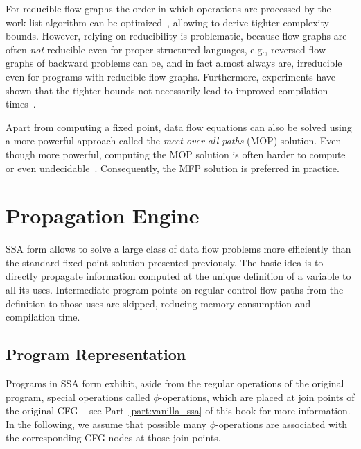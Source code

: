 For reducible flow graphs the order in which operations are processed by the
work list algorithm can be
optimized~\cite{novillo:bib:HU73,novillo:bib:KU76,novillo:bib:NNH99}, allowing
to derive tighter complexity bounds. However, relying on reducibility is
problematic, because flow graphs are often \emph{not} reducible even for proper
structured languages, e.g., reversed flow graphs of backward problems can be,
and in fact almost always are, irreducible even for programs with reducible flow
graphs. Furthermore, experiments have shown that the tighter bounds not
necessarily lead to improved compilation times~\cite{novillo:bib:CTK06}.

Apart from computing a fixed point, data flow equations can also be solved using
a more powerful approach called the \emph{meet over all paths} (MOP) solution.
Even though more powerful, computing the MOP solution is often harder to compute
or even undecidable~\cite{novillo:bib:NNH99}. Consequently, the MFP solution is
preferred in practice.

\section{Propagation Engine}
\label{novillo:sec:prop-engine} 

SSA form allows to solve a large class of data flow problems more efficiently
than the standard fixed point solution presented previously. The basic idea is
to directly propagate information computed at the unique definition of a
variable to all its uses. Intermediate program points on regular control flow
paths from the definition to those uses are skipped, reducing memory consumption
and compilation time.

\subsection{Program Representation}

Programs in SSA form exhibit, aside from the regular operations of the original
program, special operations called $\phi$-operations, which are placed at join
points of the original CFG -- see Part~\ref{part:vanilla_ssa} of this book for
more information. In the following, we assume that possible many
$\phi$-operations are associated with the corresponding CFG nodes at those
join points.

